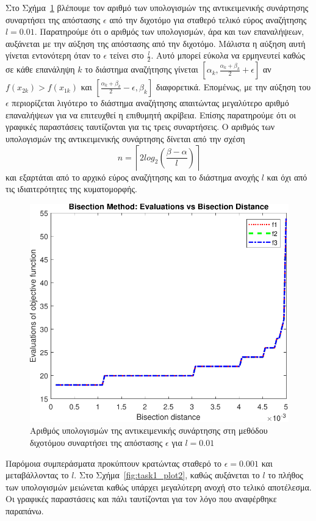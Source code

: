 \documentclass{article}
\begin{document}
Στο Σχήμα~\ref{fig:task1_plot1} βλέπουμε τον αριθμό των υπολογισμών της αντικειμενικής συνάρτησης
συναρτήσει της απόστασης $\epsilon$ από την διχοτόμο για σταθερό τελικό εύρος 
αναζήτησης $l = 0.01$. Παρατηρούμε ότι ο αριθμός των υπολογισμών, άρα και των επαναλήψεων, αυξάνεται
με την αύξηση της απόστασης από την διχοτόμο. Μάλιστα η αύξηση αυτή γίνεται εντονότερη όταν το
$\epsilon$ τείνει στο $\frac{l}{2}$. Αυτό μπορεί εύκολα να ερμηνευτεί καθώς σε κάθε
επανάληψη $k$ το διάστημα αναζήτησης γίνεται $[\alpha_k, \frac{\alpha_k + \beta_k}{2} + \epsilon]$ 
αν $f(x_{2k}) > f(x_{1k})$ και $[\frac{\alpha_k + \beta_k}{2} - \epsilon, \beta_k]$ διαφορετικά. Επομένως, με την
αύξηση του $\epsilon$ περιορίζεται λιγότερο το διάστημα αναζήτησης απαιτώντας μεγαλύτερο αριθμό επαναλήψεων
για να επιτευχθεί η επιθυμητή ακρίβεια. Επίσης παρατηρούμε ότι οι γραφικές παραστάσεις ταυτίζονται για
τις τρεις συναρτήσεις. Ο αριθμός των υπολογισμών της αντικειμενικής συνάρτησης δίνεται από την σχέση
\[ n = \left\lceil 2 log_2\left(\frac{\beta - \alpha}{l}\right) \right\rceil \]
και εξαρτάται από το αρχικό εύρος αναζήτησης και το διάστημα ανοχής $l$ και όχι από τις ιδιαιτερότητες
της κυματομορφής.

\begin{figure}
    \centering
    \includegraphics[width=0.75\linewidth]{plots/task1_plot1.pdf}
    \caption{Αριθμός υπολογισμών της αντικειμενικής συνάρτησης στη μεθόδου διχοτόμου συναρτήσει της απόστασης $\epsilon$ για $l=0.01$}
    \label{fig:task1_plot1}
\end{figure}

Παρόμοια συμπεράσματα προκύπτουν κρατώντας σταθερό το $\epsilon = 0.001$ και μεταβάλλοντας το $l$.
Στο Σχήμα~\ref{fig:task1_plot2}, καθώς αυξάνεται το $l$ το πλήθος των υπολογισμών μειώνεται καθώς 
υπάρχει μεγαλύτερη ανοχή στο τελικό αποτέλεσμα. Οι γραφικές παραστάσεις και πάλι ταυτίζονται 
για τον λόγο που αναφέρθηκε παραπάνω.
\end{document}
